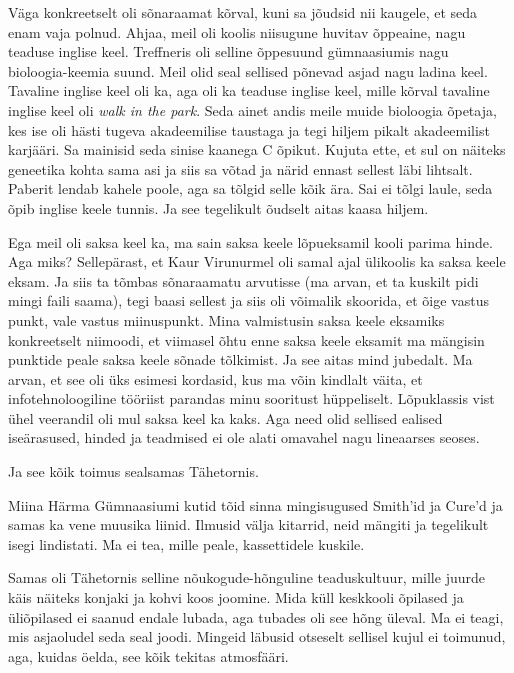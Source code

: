 Väga konkreetselt oli sõnaraamat kõrval, kuni sa jõudsid nii kaugele, et seda 
enam vaja polnud. Ahjaa, meil oli koolis  niisugune huvitav õppeaine, nagu 
teaduse inglise keel. Treffneris 
oli selline õppesuund gümnaasiumis nagu 
bioloogia-keemia suund. Meil olid seal sellised põnevad asjad nagu ladina keel. 
Tavaline inglise keel oli ka, aga oli ka teaduse inglise keel, mille 
kõrval tavaline inglise keel oli \emph{walk in the park}. Seda ainet andis 
meile muide bioloogia õpetaja, kes ise oli hästi tugeva akadeemilise taustaga ja  
tegi hiljem pikalt akadeemilist karjääri. Sa 
mainisid seda sinise kaanega C õpikut. Kujuta ette, et sul on näiteks geneetika 
kohta sama asi ja siis sa võtad ja närid ennast sellest läbi lihtsalt. Paberit lendab 
kahele poole, aga sa tõlgid selle kõik ära. Sai ei tõlgi laule, 
seda õpib inglise keele tunnis. Ja see tegelikult õudselt aitas kaasa hiljem.

Ega meil oli saksa keel ka, ma sain saksa keele lõpueksamil kooli parima hinde. 
Aga miks? Sellepärast, et Kaur Virunurmel oli samal 
ajal ülikoolis ka saksa keele eksam. Ja siis ta tõmbas sõnaraamatu arvutisse 
(ma arvan, et ta kuskilt pidi mingi faili saama), tegi baasi sellest ja siis oli 
võimalik skoorida, et õige vastus punkt, vale vastus miinuspunkt. Mina  
valmistusin saksa keele eksamiks konkreetselt niimoodi, et viimasel õhtu enne 
saksa keele eksamit ma mängisin punktide peale saksa keele sõnade tõlkimist. Ja 
see aitas mind  jubedalt. Ma arvan, et see oli üks esimesi kordasid, kus ma 
võin kindlalt väita, et infotehnoloogiline tööriist parandas minu sooritust 
hüppeliselt. Lõpuklassis vist ühel veerandil oli mul saksa keel ka kaks. Aga 
need olid sellised ealised iseärasused, hinded ja teadmised ei ole alati 
omavahel nagu lineaarses seoses.

Ja see kõik toimus sealsamas Tähetornis.

Miina Härma Gümnaasiumi kutid tõid sinna 
mingisugused Smith'id ja Cure'd ja 
samas ka vene muusika liinid. Ilmusid välja kitarrid, neid mängiti ja  
tegelikult isegi lindistati. Ma ei tea, mille peale, kassettidele kuskile. 

Samas oli Tähetornis selline  nõukogude-hõnguline teaduskultuur, mille juurde 
käis näiteks konjaki ja kohvi koos joomine. Mida küll  keskkooli õpilased ja 
üliõpilased ei saanud endale lubada, aga tubades  oli see hõng  üleval. Ma ei 
teagi, mis asjaoludel seda seal joodi. Mingeid  läbusid otseselt 
sellisel kujul ei toimunud, aga, kuidas öelda, see kõik tekitas atmosfääri.

